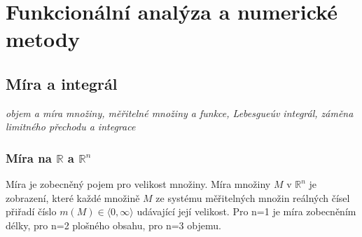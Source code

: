 
\chapter{Funkcionální analýza a numerické metody}
\section{Míra a integrál}
\textit{objem a míra množiny, měřitelné množiny a funkce, Lebesgueúv integrál, záměna limitného přechodu a integrace}
\subsection{Míra na $\mathbb{R}$ a $\mathbb{R}^n$}
Míra je zobecněný pojem pro velikost množiny. Míra množiny $M$ v $\mathbb{R}^n$ je zobrazení, které každé množině $M$ ze systému měřitelných množin reálných čísel přiřadí číslo $m(M)\in \langle0,\infty\rangle$ udávající její velikost. Pro n=1 je míra zobecněním délky, pro n=2 plošného obsahu, pro n=3 objemu.  

